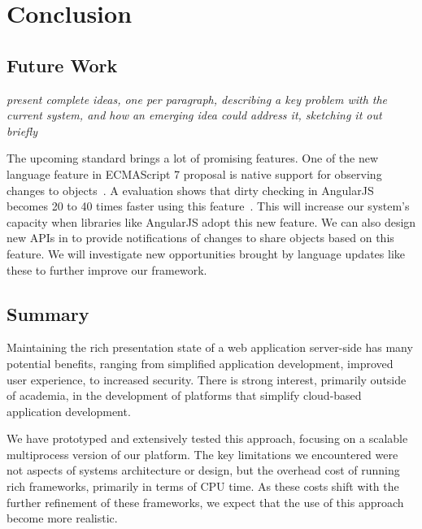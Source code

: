 \chapter{Conclusion}

\section{Future Work}

\emph{present complete ideas, one per paragraph, describing a key problem
    with the current system, and how an emerging idea could address it,
    sketching it out briefly}

The upcoming \js standard brings a lot of promising features.  One of the new
language feature in ECMAScript 7 proposal is native support for observing
changes to objects~\cite{jsobserveprop}. A evaluation shows that dirty
checking in AngularJS becomes 20 to 40 times faster using this
feature~\cite{angularjsspeedup}. This will increase our system's capacity when
libraries like AngularJS  adopt this new feature. We can also design new APIs
in \appins to provide notifications of changes to share objects based on this
feature. We will investigate new opportunities brought by language updates
like these to further improve our framework.




\section{Summary}

Maintaining the rich presentation state  of a web application server-side has
many potential benefits, ranging from simplified application development,
improved user experience, to increased security.  There is strong interest,
primarily outside of academia, in the development of platforms that simplify
cloud-based  application development.

We have prototyped and extensively tested this approach, focusing on a
scalable multiprocess version of our \cb{} platform. The key limitations we
encountered were not aspects of systems architecture or design,  but the
overhead cost of running rich frameworks, primarily in terms of CPU time.   As
these costs shift with the further refinement of these frameworks, we expect
that the use of this approach become more realistic.
